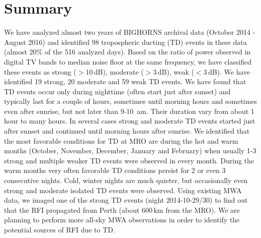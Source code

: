 \documentclass{article}
\begin{document}
\section{Summary}
\label{sec:summary}

We have analyzed almost two years of BIGHORNS archival data (October 2014 - August 2016) and identified 98 tropospheric ducting (TD) events in these data (almost 20\% of the 516 analyzed days). 
Based on the ratio of power observed in digital TV bands to median noise floor at the same frequency, we have classified these events as strong ($>$10\,dB), moderate ($>$3\,dB), weak ($<$3\,dB). We have identified 19 strong, 20 moderate and 59 weak TD events.
We have found that TD events occur only during nighttime (often start just after sunset) and typically last for a couple of hours, sometimes until morning hours and sometimes even after sunrise, but not later than 9-10~am.
Their duration vary from about 1\,hour to many hours. In several cases strong and moderate TD events started just after sunset and continued until morning hours after sunrise.
We identified that the most favorable conditions for TD at MRO are during the hot and warm months (October, November, December, January and February) when usually 1-3 strong and multiple weaker TD events were observed in every month. 
During the warm months very often favorable TD conditions persist for 2 or even 3 consecutive nights. Cold, winter nights are much quieter, but occasionally even strong and moderate isolated TD events were observed. 
Using existing MWA data, we imaged one of the strong TD events (night 2014-10-29/30) to find out that the RFI propagated from Perth (about 600\,km from the MRO).
We are planning to perform more all-sky MWA observations in order to identify the potential sources of RFI due to TD.
\end{document}
